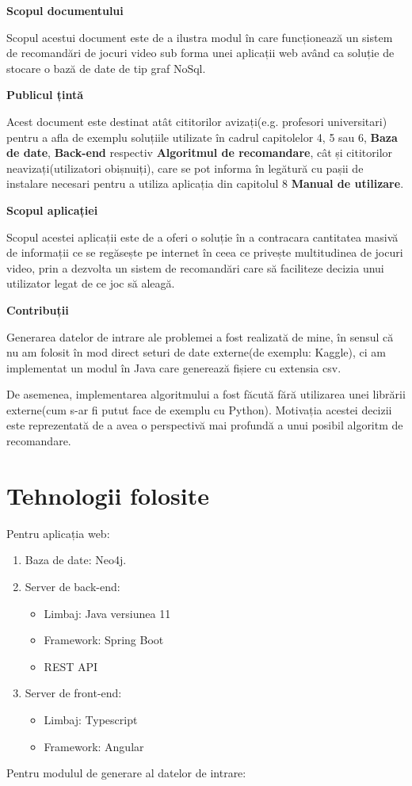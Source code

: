 \documentclass[12pt,a4paper]{report}
\begin{document}
\bigskip
\bigskip
\textbf{Scopul documentului}
\bigskip

Scopul acestui document este de a ilustra modul în care funcționează un sistem de recomandări de jocuri video sub forma unei aplicații web având ca soluție de stocare o bază de date de tip graf NoSql.

\bigskip
\textbf{Publicul țintă}
\bigskip

Acest document este destinat atât cititorilor avizați(e.g. profesori universitari) pentru a afla de exemplu soluțiile utilizate în cadrul capitolelor 4, 5 sau 6, \textbf{Baza de date}, \textbf{Back-end} respectiv \textbf{Algoritmul de recomandare}, cât și cititorilor neavizați(utilizatori obișnuiți), care se pot informa în legătură cu pașii de instalare necesari pentru a utiliza aplicația din capitolul 8 \textbf{Manual de utilizare}.

\bigskip
\textbf{Scopul aplicației}
\bigskip

Scopul acestei aplicații este de a oferi o soluție în a contracara cantitatea masivă de informații ce se regăsește pe internet \cite{5} în ceea ce privește multitudinea de jocuri video, prin a dezvolta un sistem de recomandări care să faciliteze decizia unui utilizator legat de ce joc să aleagă.

\bigskip
\textbf{Contribuții}
\bigskip  

Generarea datelor de intrare ale problemei a fost realizată de mine, în sensul că nu am folosit în mod direct seturi de date externe(de exemplu: Kaggle), ci am implementat un modul în Java care generează fișiere cu extensia csv.

De asemenea, implementarea algoritmului a fost făcută fără utilizarea unei librării externe(cum s-ar fi putut face de exemplu cu Python). Motivația acestei decizii este reprezentată de a avea o perspectivă mai profundă a unui posibil algoritm de recomandare.

\section{Tehnologii folosite}

Pentru aplicația web:

\begin{enumerate}
  \item Baza de date: Neo4j.
  \item Server de back-end:
  \begin{itemize}
     \item Limbaj: Java versiunea 11
     \item Framework: Spring Boot
     \item REST API
   \end{itemize}
  \item Server de front-end:
  \begin{itemize}
     \item Limbaj: Typescript
     \item Framework: Angular
   \end{itemize}
\end{enumerate}
Pentru modulul de generare al datelor de intrare:
\end{document}
